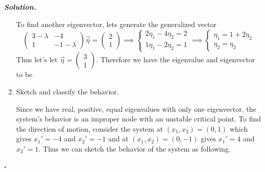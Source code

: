 \documentclass[12pt]{report}
\newenvironment{solution}[1][\it{Solution}]{\textbf{#1. } }{$\square$}
\newcommand{\paren}[1]{{\left(#1\right)}} %
\newcommand*\widefbox[1]{\fbox{#1}}
\begin{document}
\begin{solution}
\begin{enumerate}
        To find another eigenvector, lets generate the generalized vector 
        \[ \begin{pmatrix}
            3-\lambda & -4\\
            1 & -1-\lambda
        \end{pmatrix}\vec{\eta} = \begin{pmatrix}
            2\\1
        \end{pmatrix} \implies \begin{cases}
            2\eta_1 -4\eta_2 = 2\\
            1\eta_1 -2\eta_2 = 1
        \end{cases} \implies \begin{cases}
            \eta_1 = 1 + 2\eta_2\\
            \eta_2 = \eta_2
        \end{cases}\] 
        Thus let's let $\vec{\eta} = \begin{pmatrix}
            3\\1
        \end{pmatrix}$.
        Therefore we have the eigenvalue and eigenvector to be
    
    
    \item [{\bf Part b:}] Sketch and classify the behavior.
        
        \noindent
        Since we have real, positive, equal eigenvalues with only one eigenvector, the system's behavior is an improper node with an unstable critical point. To find the direction of motion, consider the system at $(x_1,x_2) = (0,1)$ which gives $x_1' = -4$ and $x_2' = -1$ and at $(x_1,x_2) = (0,-1)$ gives $x_1' = 4$ and $x_2' = 1$. Thus we can sketch the behavior of the system as following.  


\end{enumerate}
\end{solution}
\end{document}
